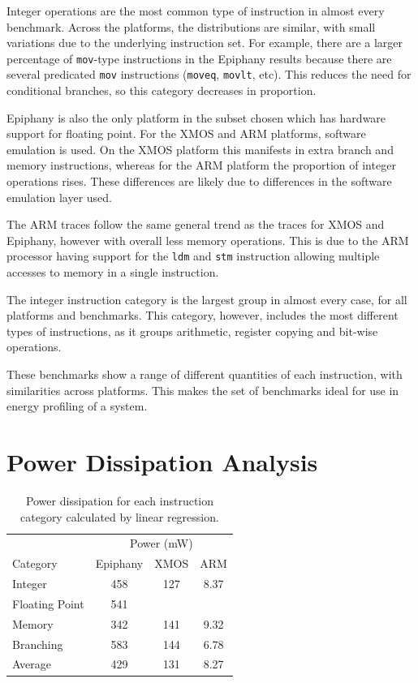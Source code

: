 \documentclass[twocolumn]{article}
\begin{document}
Integer operations are the most common type of instruction in almost every benchmark. Across the platforms, the distributions are similar, with small variations due to the underlying instruction set. For example, there are a larger percentage of \texttt{mov}-type instructions in the Epiphany results because there are several predicated \texttt{mov} instructions (\texttt{moveq}, \texttt{movlt}, etc). This reduces the need for conditional branches, so this category decreases in proportion.

Epiphany is also the only platform in the subset chosen which has hardware support for floating point. For the XMOS and ARM platforms, software emulation is used. On the XMOS platform this manifests in extra branch and memory instructions, whereas for the ARM platform the proportion of integer operations rises. These differences are likely due to differences in the software emulation layer used.

The ARM traces follow the same general trend as the traces for XMOS and Epiphany, however with overall less memory operations. This is due to the ARM processor having support for the \texttt{ldm} and \texttt{stm} instruction allowing multiple accesses to memory in a single instruction.

The integer instruction category is the largest group in almost every case, for all platforms and benchmarks. This category, however, includes the most different types of instructions, as it groups arithmetic, register copying and bit-wise operations.

These benchmarks show a range of different quantities of each instruction, with similarities across platforms. This makes the set of benchmarks ideal for use in energy profiling of a system.

\section{Power Dissipation Analysis}

\begin{table}
	\centering
	\begin{tabular}{l c c c}
						& \multicolumn{3}{c}{Power (mW)}\\
		Category 		& Epiphany 	& XMOS 	& ARM  	\\
		\hline
		Integer         &   458     & 127   & 8.37  \\
		Floating Point  &   541     &       &	  	\\
		Memory          &   342     & 141   & 9.32  \\
		Branching       &   583     & 144   & 6.78  \\
		\hline
		Average			&	429 	& 131   & 8.27


	\end{tabular}
	\caption{Power dissipation for each instruction category calculated by linear regression.}
	\label{Table:RegressionResults}
\end{table}
\end{document}
